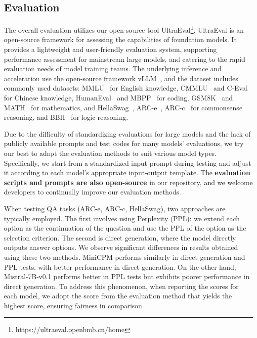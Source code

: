

\subsection{Evaluation}
\label{sec:evaluation}
The overall evaluation utilizes our open-source tool UltraEval\footnote{https://ultraeval.openbmb.cn/home}. UltraEval is an open-source framework for assessing the capabilities of foundation models. It provides a lightweight and user-friendly evaluation system, supporting performance assessment for mainstream large models, and catering to the rapid evaluation needs of model training teams. The underlying inference and acceleration use the open-source framework vLLM~\citep{kwon2023efficient}, and the dataset includes commonly used datasets: MMLU~\citep{hendrycks2020measuring} for English knowledge, CMMLU~\citep{li2024cmmlu} and C-Eval~\citep{huang2024c} for Chinese knowledge, HumanEval~\citep{chen2021evaluating} and MBPP~\citep{austin2021program} for coding, GSM8K~\citep{cobbe2021training} and MATH~\citep{hendrycks2021measuring} for mathematics, and HellaSwag~\citep{zellers2019hellaswag}, ARC-e~\citep{clark2018think}, ARC-c~\citep{clark2018think} for commonsense reasoning, and BBH~\citep{suzgun2022challenging} for logic reasoning. 

Due to the difficulty of standardizing evaluations for large models and the lack of publicly available prompts and test codes for many models' evaluations, we try our best to adapt the evaluation methods to suit various model types. Specifically, we start from a standardized input prompt during testing and adjust it according to each model's appropriate input-output template. The \textbf{evaluation scripts and prompts are also open-source} in our repository, and we welcome developers to continually improve our evaluation methods.

When testing QA tasks (ARC-e, ARC-c, HellaSwag), two approaches are typically employed. The first involves using Perplexity (PPL): we extend each option as the continuation of the question and use the PPL of the option as the selection criterion. The second is direct generation, where the model directly outputs answer options. We observe significant differences in results obtained using these two methods.  MiniCPM performs similarly in direct generation and PPL tests, with better performance in direct generation. On the other hand, Mistral-7B-v0.1 performs better in PPL tests but exhibits poorer performance in direct generation. To address this phenomenon, when reporting the scores for each model, we adopt the score from the evaluation method that yields the highest score, ensuring fairness in comparison.

